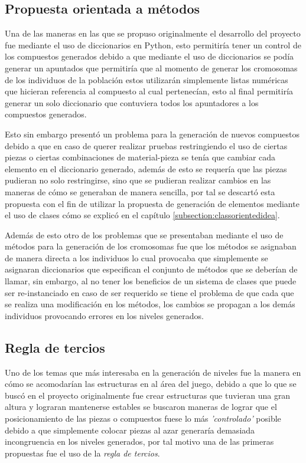 \subsection{Propuesta orientada a métodos}
\label{subsection:objectorientedidea}

Una de las maneras en las que se propuso originalmente el desarrollo del proyecto
fue mediante el uso de diccionarios en Python, esto permitiría
tener un control de los compuestos generados debido a que mediante el uso de
diccionarios se podía generar un apuntados que permitiría que al momento de
generar los cromosomas de los individuos de la población estos utilizarán
simplemente listas numéricas que hicieran referencia al compuesto al cual
pertenecían, esto al final permitiría generar un solo diccionario que
contuviera todos los apuntadores a los compuestos generados.

Esto sin embargo presentó un problema para la generación de nuevos compuestos
debido a que en caso de querer realizar pruebas restringiendo el uso de ciertas
piezas o ciertas combinaciones de material-pieza se tenía que cambiar cada
elemento en el diccionario generado, además de esto se requería que las
piezas pudieran no solo restringirse, sino que se pudieran realizar cambios en
las maneras de cómo se generaban de manera sencilla, por tal se descartó esta
propuesta con el fin de utilizar la propuesta de generación de elementos
mediante el uso de clases cómo se explicó en el capítulo
\ref{subsection:classorientedidea}.

Además de esto otro de los problemas que se presentaban mediante el uso de
métodos para la generación de los cromosomas fue que los métodos se asignaban de
manera directa a los individuos lo cual provocaba que simplemente se asignaran
diccionarios que especifican el conjunto de métodos que se deberían de llamar,
sin embargo, al no tener los beneficios de un sistema de clases que puede ser
re-instanciado en caso de ser requerido se tiene el problema de que cada que se
realiza una modificación en los métodos, los cambios se propagan a los
demás individuos provocando errores en los niveles generados.


\subsection{Regla de tercios}
\label{subsection:ruleofthirds}

Uno de los temas que más interesaba en la generación de niveles fue la manera en
cómo se acomodarían las estructuras en al área del juego, debido a que lo que se
buscó en el proyecto originalmente fue crear estructuras que tuvieran una gran
altura y lograran mantenerse estables se buscaron maneras de lograr que el
posicionamiento de las piezas o compuestos fuese lo más \textit{'controlado'}
posible debido a que simplemente colocar piezas al azar generaría demasiada incongruencia
en los niveles generados, por tal motivo una de las primeras propuestas fue el
uso de la \textit{regla de tercios}.

